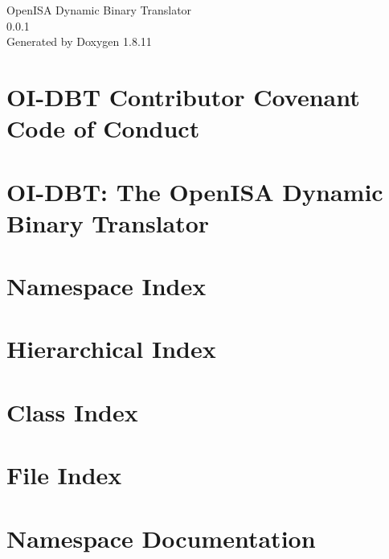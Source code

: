 \documentclass[twoside]{book}
\newcommand{\+}{\discretionary{\mbox{\scriptsize$\hookleftarrow$}}{}{}}
\newcommand{\clearemptydoublepage}{%
  \newpage{\pagestyle{empty}\cleardoublepage}%
}
\begin{document}
\hypersetup{pageanchor=false,
             bookmarksnumbered=true,
             pdfencoding=unicode
            }
\begin{titlepage}
\vspace*{7cm}
\begin{center}%
{\Large Open\+I\+SA Dynamic Binary Translator \\[1ex]\large 0.\+0.\+1 }\\
\vspace*{1cm}
{\large Generated by Doxygen 1.8.11}\\
\end{center}
\end{titlepage}
\clearemptydoublepage
\tableofcontents
\clearemptydoublepage
{}
\hypersetup{pageanchor=true}

\chapter{O\+I-\/\+D\+BT Contributor Covenant Code of Conduct}
\label{md_CODE_OF_CONDUCT}
\hypertarget{md_CODE_OF_CONDUCT}{}

\chapter{O\+I-\/\+D\+BT\+: The Open\+I\+SA Dynamic Binary Translator}
\label{md_README}
\hypertarget{md_README}{}

\chapter{Namespace Index}

\chapter{Hierarchical Index}

\chapter{Class Index}

\chapter{File Index}

\chapter{Namespace Documentation}

\end{document}
